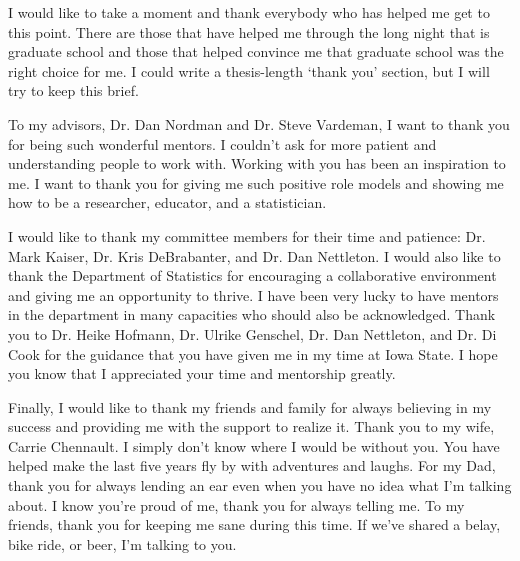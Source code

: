 
I would like to take a moment and thank everybody who has helped me get to this point. There are those that have helped me through the long night that is graduate school and those that helped convince me that graduate school was the right choice for me. I could write a thesis-length `thank you' section, but I will try to keep this brief.

To my advisors, Dr. Dan Nordman and Dr. Steve Vardeman, I want to thank you for being such wonderful mentors. I couldn't ask for more patient and understanding people to work with. Working with you has been an inspiration to me. I want to thank you for giving me such positive role models and showing me how to be a researcher, educator, and a statistician.

I would like to thank my committee members for their time and patience: Dr. Mark Kaiser, Dr. Kris DeBrabanter, and Dr. Dan Nettleton. I would also like to thank the Department of Statistics for encouraging a collaborative environment
and giving me an opportunity to thrive. I have been very lucky to have mentors in the department in many capacities who should also be acknowledged. Thank you to Dr. Heike Hofmann, Dr. Ulrike Genschel, Dr. Dan Nettleton, and Dr. Di Cook for the guidance that you have given me in my time at Iowa State. I hope you know that I appreciated your time and mentorship greatly.

Finally, I would like to thank my friends and family for always believing in my success and providing me with the support to realize it. Thank you to my wife, Carrie Chennault. I simply don't know where I would be without you. You have helped make the last five years fly by with adventures and laughs. For my Dad, thank you for always lending an ear even when you have no idea what I'm talking about. I know you're proud of me, thank you for always telling me. To my friends, thank you for keeping me sane during this time. If we've shared a belay, bike ride, or beer, I'm talking to you.